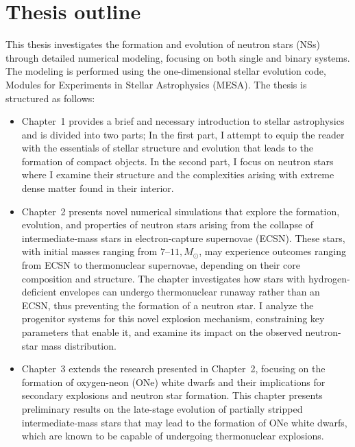 \documentclass[main.tex]{subfiles}
\begin{document}
    \section{Thesis outline}
    This thesis investigates the formation and evolution of neutron stars (NSs) through detailed numerical modeling, focusing on both single and binary systems. The modeling is performed using the one-dimensional stellar evolution code, Modules for Experiments in Stellar Astrophysics (MESA). The thesis is structured as follows:
    \begin{itemize}
        \item Chapter~1 provides a brief and necessary introduction to stellar astrophysics and is divided into two parts; In the first part, I attempt to equip the reader with the essentials of stellar structure and evolution that leads to the formation of compact objects. In the second part, I focus on neutron stars where I examine their structure and the complexities arising with extreme dense matter found in their interior.
    
        \item Chapter~2 presents novel numerical simulations that explore the formation, evolution, and properties of neutron stars arising from the collapse of intermediate-mass stars in electron-capture supernovae (ECSN). These stars, with initial masses ranging from $7–11 , M_\odot$, may experience outcomes ranging from ECSN to thermonuclear supernovae, depending on their core composition and structure. The chapter investigates how stars with hydrogen-deficient envelopes can undergo thermonuclear runaway rather than an ECSN, thus preventing the formation of a neutron star. I analyze the progenitor systems for this novel explosion mechanism, constraining key parameters that enable it, and examine its impact on the observed neutron-star mass distribution.

        \item Chapter~3 extends the research presented in Chapter~2, focusing on the formation of oxygen-neon (ONe) white dwarfs and their implications for secondary explosions and neutron star formation. This chapter presents preliminary results on the late-stage evolution of partially stripped intermediate-mass stars that may lead to the formation of ONe white dwarfs, which are known to be capable of undergoing thermonuclear explosions.


\end{itemize}
\end{document}
